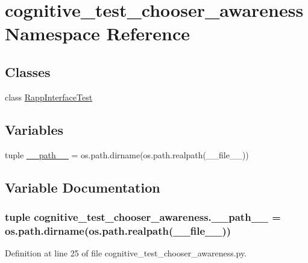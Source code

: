 \hypertarget{namespacecognitive__test__chooser__awareness}{\section{cognitive\-\_\-test\-\_\-chooser\-\_\-awareness Namespace Reference}
\label{namespacecognitive__test__chooser__awareness}
}
\subsection*{Classes}
\begin{DoxyCompactItemize}
\item 
class \hyperlink{classcognitive__test__chooser__awareness_1_1RappInterfaceTest}{Rapp\-Interface\-Test}
\end{DoxyCompactItemize}
\subsection*{Variables}
\begin{DoxyCompactItemize}
\item 
tuple \hyperlink{namespacecognitive__test__chooser__awareness_ad44b327662ef9a4f9a5427d53da8f57f}{\-\_\-\-\_\-path\-\_\-\-\_\-} = os.\-path.\-dirname(os.\-path.\-realpath(\-\_\-\-\_\-file\-\_\-\-\_\-))
\end{DoxyCompactItemize}


\subsection{Variable Documentation}
\hypertarget{namespacecognitive__test__chooser__awareness_ad44b327662ef9a4f9a5427d53da8f57f}{
\subsubsection[{\-\_\-\-\_\-path\-\_\-\-\_\-}]{\setlength{\rightskip}{0pt plus 5cm}tuple cognitive\-\_\-test\-\_\-chooser\-\_\-awareness.\-\_\-\-\_\-path\-\_\-\-\_\- = os.\-path.\-dirname(os.\-path.\-realpath(\-\_\-\-\_\-file\-\_\-\-\_\-))}}\label{namespacecognitive__test__chooser__awareness_ad44b327662ef9a4f9a5427d53da8f57f}


Definition at line 25 of file cognitive\-\_\-test\-\_\-chooser\-\_\-awareness.\-py.

